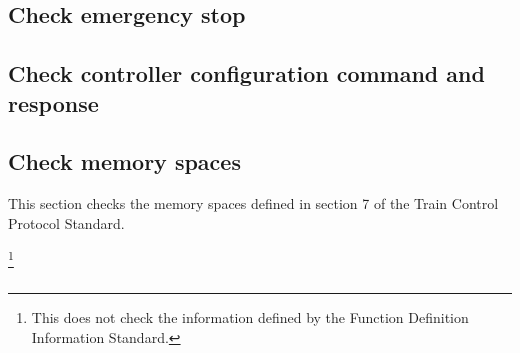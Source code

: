 \subsection{Check emergency stop}

\subsection{Check controller configuration command and response}

\subsection{Check memory spaces}

This section checks the memory spaces defined in section 7
of the Train Control Protocol Standard.

\footnote{This does not check the information defined by the 
    Function Definition Information Standard.
}
    
\subsection{}

  
